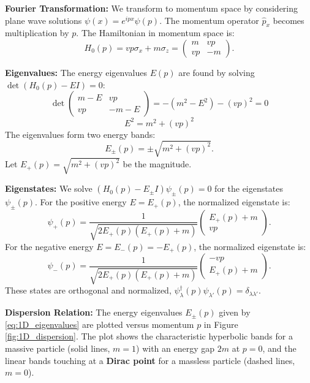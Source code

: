 \documentclass[11pt]{article}
\begin{document}
\textbf{Fourier Transformation:}
We transform to momentum space by considering plane wave solutions $\psi(x) = e^{ipx} \psi(p)$. The momentum operator $\hat{p}_x$ becomes multiplication by $p$. The Hamiltonian in momentum space is:
\begin{equation}
H_0(p) = v p \sigma_x + m \sigma_z = \begin{pmatrix} m & v p \\ v p & -m \end{pmatrix}.
\end{equation}

\textbf{Eigenvalues:}
The energy eigenvalues $E(p)$ are found by solving $\det(H_0(p) - E I) = 0$:
\[ \det \begin{pmatrix} m - E & v p \\ v p & -m - E \end{pmatrix} = -(m^2 - E^2) - (v p)^2 = 0 \]
\[ E^2 = m^2 + (v p)^2 \]
The eigenvalues form two energy bands:
\begin{equation}
E_{\pm}(p) = \pm \sqrt{m^2 + (v p)^2}.
\label{eq:1D_eigenvalues}
\end{equation}
Let $E_+(p) = \sqrt{m^2 + (v p)^2}$ be the magnitude.


\textbf{Eigenstates:}
We solve $(H_0(p) - E_{\pm} I) \psi_{\pm}(p) = 0$ for the eigenstates $\psi_{\pm}(p)$.
For the positive energy $E = E_+(p)$, the normalized eigenstate is:
\begin{equation}
\psi_+(p) = \frac{1}{\sqrt{2 E_+(p) (E_+(p) + m)}} \begin{pmatrix} E_+(p) + m \\ v p \end{pmatrix}.
\label{eq:1D_eigenstate_plus}
\end{equation}
For the negative energy $E = E_-(p) = -E_+(p)$, the normalized eigenstate is:
\begin{equation}
\psi_-(p) = \frac{1}{\sqrt{2 E_+(p) (E_+(p) + m)}} \begin{pmatrix} -v p \\ E_+(p) + m \end{pmatrix}.
\label{eq:1D_eigenstate_minus}
\end{equation}
These states are orthogonal and normalized, $\psi_{\lambda}^\dagger(p) \psi_{\lambda'}(p) = \delta_{\lambda \lambda'}$.

\textbf{Dispersion Relation:}
The energy eigenvalues $E_{\pm}(p)$ given by \eqref{eq:1D_eigenvalues} are plotted versus momentum $p$ in Figure \ref{fig:1D_dispersion}. The plot shows the characteristic hyperbolic bands for a massive particle (solid lines, $m=1$) with an energy gap $2m$ at $p=0$, and the linear bands touching at a \textbf{Dirac point} for a massless particle (dashed lines, $m=0$).
\end{document}
